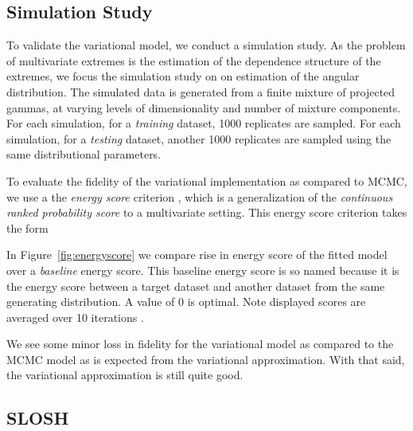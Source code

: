 \subsection{Simulation Study}
To validate the variational model, we conduct a simulation study.
    As the problem of multivariate extremes is the estimation of the dependence
    structure of the extremes, we focus the simulation study on on estimation of
    the angular distribution.  The simulated data is generated from a finite
    mixture of projected gammas, at varying levels of dimensionality and number
    of mixture components.  For each simulation, for a \emph{training} dataset,
    \num{1000} replicates are sampled.  For each simulation, for a 
    \emph{testing} dataset, another \num{1000} replicates are sampled using
    the same distributional parameters.

To evaluate the fidelity of the variational implementation as compared to MCMC, 
    we use a the \emph{energy score} criterion \citep{gneiting2007}, which is a
    generalization of the \emph{continuous ranked probability score} to a
    multivariate setting.  This energy score criterion takes the form
    
    In Figure~\ref{fig:energyscore} we compare rise in energy score of the fitted
    model over a \emph{baseline} energy score.  This baseline energy score is so
    named because it is the energy score between a target dataset and another
    dataset from the same generating distribution.  A value of 0 is optimal.
      Note displayed scores are 
    averaged over 10 iterations .
    
    We see some minor loss in fidelity for the variational model as compared to 
    the MCMC model as is expected from the variational approximation.  With that
    said, the variational approximation is still quite good.

\subsection{SLOSH}

